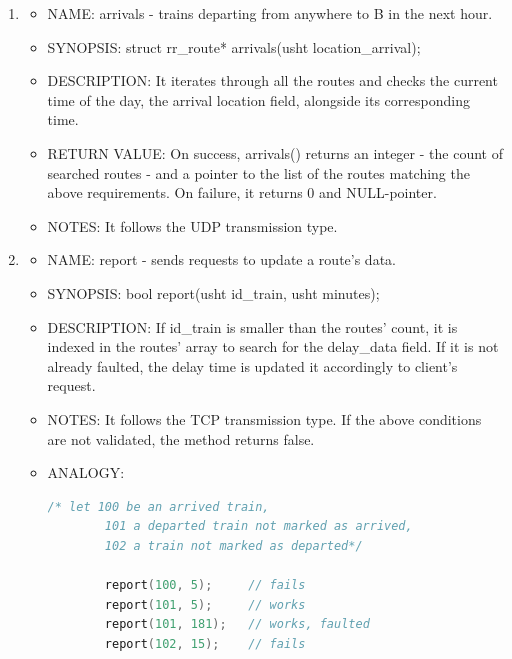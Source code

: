 \documentclass[runningheads]{llncs}
\begin{document}
\begin{enumerate}
  \item \begin{itemize}
    \item NAME: arrivals - trains departing from anywhere to B in the next hour.
    \item SYNOPSIS: struct rr\_route* arrivals(usht location\_arrival);
    \item DESCRIPTION: It iterates through  all the routes and checks the current time of the day, the arrival location field, alongside its corresponding time. 
    \item RETURN VALUE: On success, arrivals() returns an integer - the count of searched routes - and a pointer to the list of the routes matching the above requirements. On failure, it returns 0 and NULL-pointer.
    \item NOTES: It follows the UDP transmission type.
    \vspace{0.3cm}
  \end{itemize}
   
  \item \begin{itemize}
    \item NAME: report - sends requests to update a route's data.
    \item SYNOPSIS: bool report(usht id\_train, usht minutes);
    \item DESCRIPTION: If id\_train is smaller than the routes' count, it is indexed in the routes' array to search for the delay\_data field. If it is not already faulted, the delay time is updated it accordingly to client's request.
    \item NOTES: It follows the TCP transmission type. If the above conditions are not validated, the method returns false.
    \item ANALOGY:
      \begin{lstlisting}[language=C++]
        /* let 100 be an arrived train,
        101 a departed train not marked as arrived, 
        102 a train not marked as departed*/
        
        report(100, 5);     // fails
        report(101, 5);     // works
        report(101, 181);   // works, faulted
        report(102, 15);    // fails
      \end{lstlisting}
    \vspace{0.3cm}
  \end{itemize}
   

\end{enumerate}
\end{document}
